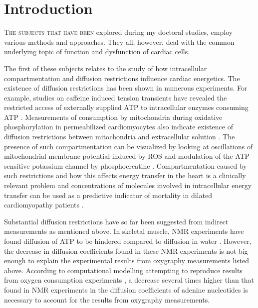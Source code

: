 \chapter{Introduction}
\lettrine[lines=2, lhang=0.33, loversize=0.25]{T}{he subjects that have
been} explored during my doctoral studies, 
employ various methods and approaches. They all, however, deal 
with the common underlying topic of function and dysfunction of cardiac
cells. 

The first of these subjects relates to the study of how intracellular
compartmentation and diffusion restrictions influence cardiac
energetics. The existence of diffusion restrictions has been shown in
numerous experiments. For example, studies on caffeine induced tension
transients have revealed the restricted access of externally supplied
\ac{ATP} to intracellular enzymes consuming \ac{ATP} \cite{Kaasik_01_CircRes_89_p153}.
Measurements of  consumption by mitochondria during oxidative
phosphorylation in permeabilized cardiomyocytes also
indicate existence of diffusion restrictions between mitochondria and
extracellular solution
\cite{Sepp_10_BiophysJ_98_p2785,Kummel_88_CardiovascRes_22_p359}. The presence of such compartmentation can
be visualized by looking at oscillations of mitochondrial
membrane potential induced by \ac{ROS}
\cite{Kurz_10_ProcNatlAcadSci_107_p14315} and modulation of the \ac{ATP}
sensitive potassium channel by phosphocreatine
\citep{Abraham_02_JBiolChem_277_p24427}. Compartmentation caused by such restrictions
and how this affects energy transfer in the heart is a clinically
relevant problem \cite{Gudbjarnason_70_JMolCellCardiol_1_p325} and
concentrations of molecules involved in
intracellular energy transfer can be used as a predictive indicator of
mortality in dilated cardiomyopathy patients
\cite{Neubauer_07_NEnglJMed_356_p1140}.

Substantial diffusion restrictions have so far been suggested from
indirect measurements as mentioned above. In skeletal muscle,
\ac{NMR} experiments have found diffusion of \ac{ATP} to be
hindered compared to diffusion in water
\cite{Kushmerick_69_Science_80-__166_p1297,deGraaf_00_BiophysJ_78_p1657}.
However, the decrease in diffusion coefficients found in these \ac{NMR}
experiments is not big enough to explain the experimental results from
oxygraphy measurements listed above. According to computational
modelling attempting to reproduce results from oxygen consumption
experiments
\cite{Saks_03_BiophysJ_84_p3436}, a decrease several times higher than
that found in \ac{NMR} experiments in the diffusion coefficients of
adenine nucleotides is necessary to account for the results from
oxygraphy measurements.


